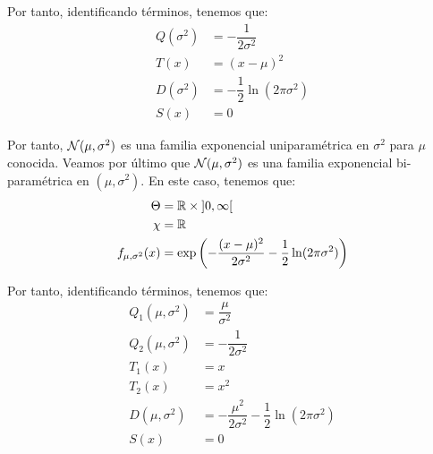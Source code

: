 \begin{ejercicio}
    Por tanto, identificando términos, tenemos que:
    \begin{align*}
        Q(\sigma^2) &= -\dfrac{1}{2\sigma^2} \\
        T(x) &= (x-\mu)^2 \\
        D(\sigma^2) &= -\dfrac{1}{2}\ln(2\pi\sigma^2) \\
        S(x) &= 0
    \end{align*}

    Por tanto, $\mathcal{N}(\mu, \sigma^2)$ es una familia exponencial uniparamétrica en $\sigma^2$ para $\mu$ conocida. Veamos por último que $\mathcal{N}(\mu, \sigma^2)$ es una familia exponencial bi-paramétrica en $(\mu, \sigma^2)$. En este caso, tenemos que:
    \begin{align*}
        \Theta &= \mathbb{R}\times\left]0, \infty\right[ \\
        \chi &= \mathbb{R} \\
        f_{\mu, \sigma^2}(x) &= \exp\left(-\dfrac{(x-\mu)^2}{2\sigma^2} - \dfrac{1}{2}\ln(2\pi\sigma^2)\right)
    \end{align*}

    Por tanto, identificando términos, tenemos que:
    \begin{align*}
        Q_1(\mu, \sigma^2) &= \dfrac{\mu}{\sigma^2} \\
        Q_2(\mu, \sigma^2) &= -\dfrac{1}{2\sigma^2} \\
        T_1(x) &= x \\
        T_2(x) &= x^2 \\
        D(\mu, \sigma^2) &= -\dfrac{\mu^2}{2\sigma^2} - \dfrac{1}{2}\ln(2\pi\sigma^2) \\
        S(x) &= 0
    \end{align*}

\end{ejercicio}

